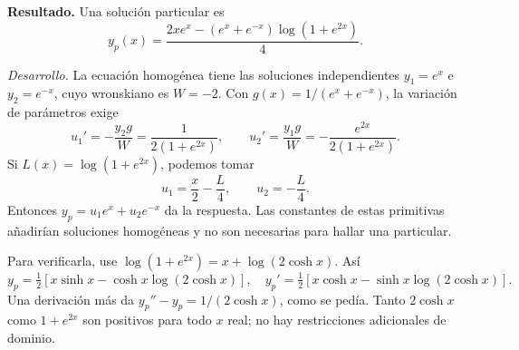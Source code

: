 \noindent\textbf{Resultado.} Una solución particular es
\[y_p(x)=\frac{2xe^x-(e^x+e^{-x})\log(1+e^{2x})}{4}.
\]

\noindent\textit{Desarrollo.} La ecuación homogénea tiene las soluciones independientes \(y_1=e^x\) e \(y_2=e^{-x}\), cuyo wronskiano es \(W=-2\). Con \(g(x)=1/(e^x+e^{-x})\), la variación de parámetros exige
\[u_1'=-\frac{y_2g}{W}=\frac1{2(1+e^{2x})},\qquad
u_2'=\frac{y_1g}{W}=-\frac{e^{2x}}{2(1+e^{2x})}.\]
Si \(L(x)=\log(1+e^{2x})\), podemos tomar
\[u_1=\frac x2-\frac L4,\qquad u_2=-\frac L4.\]
Entonces \(y_p=u_1e^x+u_2e^{-x}\) da la respuesta. Las constantes de estas primitivas añadirían soluciones homogéneas y no son necesarias para hallar una particular.

Para verificarla, use \(\log(1+e^{2x})=x+\log(2\cosh x)\). Así
\[y_p=\tfrac12[x\sinh x-\cosh x\log(2\cosh x)],\quad
y_p'=\tfrac12[x\cosh x-\sinh x\log(2\cosh x)].\]
Una derivación más da \(y_p''-y_p=1/(2\cosh x)\), como se pedía. Tanto \(2\cosh x\) como \(1+e^{2x}\) son positivos para todo \(x\) real; no hay restricciones adicionales de dominio.

